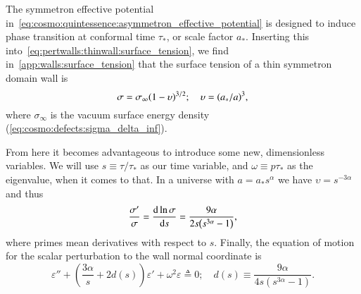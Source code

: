 




\newcommand{\eqregimenum}{\ALIASeqregimenum}






The symmetron effective potential in~\cref{eq:cosmo:quintessence:asymmetron_effective_potential} is designed to induce phase transition at conformal time $\tau_\ast$, or scale factor $a_\ast$. Inserting this into~\cref{eq:pertwalls:thinwall:surface_tension}, we find in~\cref{app:walls:surface_tension} that the surface tension of a thin symmetron domain wall is
\begin{equation}
    \sigma = \sigma_\infty {\left( 1 -\upsilon  \right)}^{3/2}; \quad \upsilon={\left( a_\ast/a \right)}^3,
\end{equation}
where $\sigma_\infty$ is the vacuum surface energy density (\cref{eq:cosmo:defects:sigma_delta_inf}). 

From here it becomes advantageous to introduce some new, dimensionless variables. %
We will use $s\equiv \tau/\tau_\ast$ as our time variable, and $\omega \equiv p\tau_\ast$ as the eigenvalue, when it comes to that. In a universe with $a = a_\ast s^\alpha$ we have $\upsilon = s^{-3\alpha}$ and thus  %
\begin{equation}
    \frac{\sigma '}{\sigma} 
    = \dv{\ln{\sigma}}{s} = \frac{9\alpha}{2s{\left( s^{3\alpha} -1  \right)}},
\end{equation}
where primes mean derivatives with respect to $s$. %
Finally, the equation of motion for the scalar perturbation to the wall normal coordinate is
\begin{equation}\label{eq:pertwalls:mywalls:eom_final}
    \varepsilon'' + \left(  \frac{3\alpha}{s}  + 2 d(s)\right)\varepsilon' + \omega^2\varepsilon \triangleq 0; \quad d(s)\equiv \frac{9\alpha}{4 s \left( s^{3\alpha}-1 \right)}.
\end{equation}

